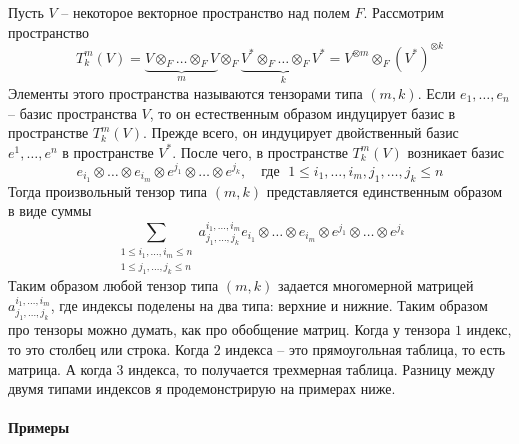 Пусть $V$ -- некоторое векторное пространство над полем $F$.
Рассмотрим пространство
\[
T^m_k(V) = \underbrace{V\otimes_F \ldots \otimes_F V}_{m}\otimes_F\underbrace{V^*\otimes_F \ldots \otimes_F V^*}_{k} = V^{\otimes m}\otimes_F(V^*)^{\otimes k}
\]
Элементы этого пространства называются тензорами типа $(m, k)$.
Если $e_1,\ldots,e_n$ -- базис пространства $V$, то он естественным образом индуцирует базис в пространстве $T^m_k(V)$.
Прежде всего, он индуцирует двойственный базис $e^1,\ldots,e^n$ в пространстве $V^*$.
После чего, в пространстве $T^m_k(V)$ возникает базис
\[
e_{i_1}\otimes \ldots \otimes e_{i_m}\otimes e^{j_1}\otimes \ldots \otimes e^{j_k},\quad\text{где }\; 1\leqslant i_1,\ldots,i_m,j_1,\ldots,j_k \leqslant n
\]
Тогда произвольный тензор типа $(m,k)$ представляется единственным образом в виде суммы
\[
\sum_{\substack{1\leqslant i_1,\ldots,i_m\leqslant n\\1\leqslant j_1,\ldots,j_k\leqslant n}} a^{i_1,\ldots,i_m}_{j_1,\ldots,j_k}e_{i_1}\otimes \ldots \otimes e_{i_m}\otimes e^{j_1}\otimes \ldots \otimes e^{j_k}
\]
Таким образом любой тензор типа $(m,k)$ задается многомерной матрицей $a^{i_1,\ldots,i_m}_{j_1,\ldots,j_k}$, где индексы поделены на два типа: верхние и нижние.
Таким образом про тензоры можно думать, как про обобщение матриц.
Когда у тензора $1$ индекс, то это столбец или строка.
Когда $2$ индекса -- это прямоугольная таблица, то есть матрица.
А когда $3$ индекса, то получается трехмерная таблица.
Разницу между двумя типами индексов я продемонстрирую на примерах ниже.

\paragraph{Примеры}

